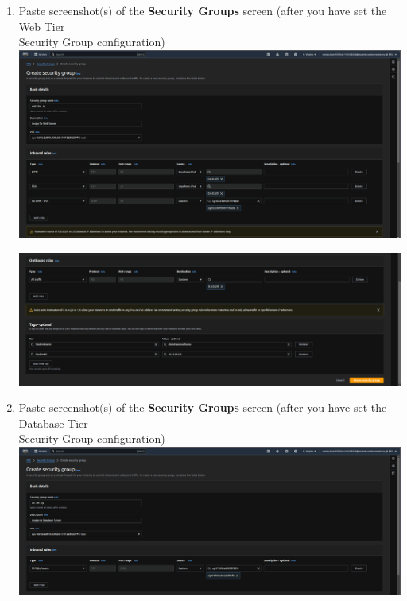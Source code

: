 \documentclass[11pt]{article}
\begin{document}
\begin{enumerate}[resume]
    \item Paste screenshot$($s$)$ of the \textbf{Security Groups} screen (after you have set the Web Tier \\ Security Group configuration)\\

    {\centering
    \includegraphics[width=5.8in]{pics/12a.png}
    }


    {\centering
    \includegraphics[width=5.8in]{pics/12b.png}
    }



    \item Paste screenshot$($s$)$ of the \textbf{Security Groups} screen (after you have set the Database Tier\\ Security Group configuration) \\

    {\centering
    \includegraphics[width=5.8in]{pics/13a.png}
    }



\end{enumerate}
\end{document}
